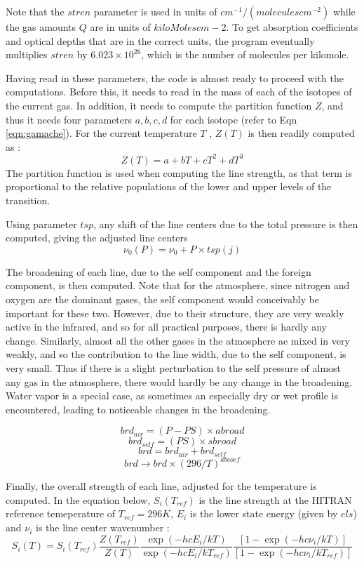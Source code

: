 \documentclass[11pt]{article}
\begin{document}
Note that the $stren$ parameter is used in units of 
$cm^{-1}/(moleculescm^{-2})$ while the gas amounts $Q$ are in units of 
$kiloMolescm-2$. To get absorption coefficients and optical depths that 
are in the correct units, the program eventually multiplies $stren$ by 
$6.023 \times 10^{26}$, which is the number of molecules per kilomole. 

Having read in these parameters, the code is almost ready to proceed with 
the computations. Before this, it needs to read in the mass of each of the 
isotopes of the current gas. In addition, it needs to compute the 
partition function $Z$, and thus it needs four parameters $a, b, c, d$ for 
each isotope (refer to Eqn \ref{eqn:gamache}). For the current temperature 
$T$ , $Z(T)$ is then readily computed as : 
\[
Z(T ) = a + bT + cT^{2} + dT^{3}
\] 
The partition function is used when computing the line strength, as that 
term is proportional to the relative populations of the lower and upper 
levels of the transition. 

Using parameter $tsp$, any shift of the line centers due 
to the total pressure is then computed,  giving the adjusted line centers 
\[ 
\nu_{0}(P) = \nu_{0} + P \times tsp(j)
\]

The broadening of each line, due to the self component and the foreign 
component, is then computed. Note that for the atmosphere, since nitrogen 
and oxygen are the dominant gases, the self component would conceivably be 
important for these two. However, due to their structure, they are very 
weakly active in the infrared, and so for all practical purposes, there is 
hardly any change. Similarly, almost all the other gases in the atmosphere 
ae mixed in very weakly, and so the contribution to the line width, due 
to the self component, is very small. Thus if there is a slight 
perturbation to the self pressure of almost any gas in the atmosphere, 
there would hardly be any change in the broadening. Water vapor is a 
special case, as sometimes an especially dry or wet profile is 
encountered, leading to noticeable changes in the broadening. 

\[
brd_{air} = (P - PS) \times abroad
\]
\[
brd_{self} = (PS) \times sbroad
\]
\[
brd = brd_{air} + brd_{self}
\]
\[
brd \rightarrow brd \times (296/T)^{abcoef}
\]

Finally, the overall strength of each line, adjusted for the temperature 
is computed. In the equation below, $S_{i}(T_{ref})$ is the line strength 
at the HITRAN reference temeperature of $T_{ref} = 296K$, $E_{i}$ is the 
lower state energy (given by $els$) and $\nu_{i}$ is the line center 
wavenumber : 
\[
 S_i (T) = S_i (T_{ref})
 \frac{ Z(T_{ref}) }{ Z(T) }
 \frac{ \exp(-hcE_i /kT) }{ \exp(-hcE_i /kT_{ref}) }
 \frac{ [1-\exp(-hc\nu_i /kT)] }{ [1-\exp(-hc\nu_i /kT_{ref})] }
\]
\end{document}
